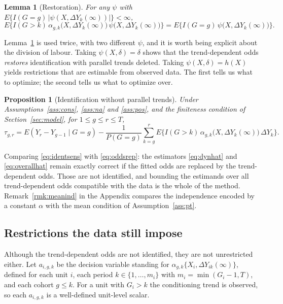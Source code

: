 \documentclass[12pt]{article}
\newtheorem{lemma}{Lemma}
\newtheorem{proposition}{Proposition}
\theoremstyle{remark}
\begin{document}
\begin{lemma}[Restoration]
\label{lem:restore}
For any $\psi$ with $E\{I(G{=}g)\,|\psi(X, \Delta Y_k(\infty))|\} < \infty$,
\begin{equation}
E\big\{ I(G{>}k)\, \alpha_{g,k}\big(X, \Delta Y_k(\infty)\big)\,
 \psi\big(X, \Delta Y_k(\infty)\big)\big\}
= E\big\{ I(G{=}g)\, \psi\big(X, \Delta Y_k(\infty)\big)\big\}.
\label{eq:restore}
\end{equation}
\end{lemma}

Lemma~\ref{lem:restore} is used twice, with two different $\psi$, and it is worth being
explicit about the division of labour. Taking $\psi(X,\delta) = \delta$ shows that the
trend-dependent odds \emph{restores} identification with parallel trends deleted. Taking
$\psi(X,\delta) = h(X)$ yields restrictions that are estimable from observed data. The
first tells us what to optimize; the second tells us what to optimize over.

\begin{proposition}[Identification without parallel trends]
\label{prop:ident}
Under Assumptions~\ref{ass:cons}, \ref{ass:na} and \ref{ass:pos}, and the finiteness
condition of Section~\ref{sec:model}, for $1 \le g \le r \le T$,
\begin{equation}
\tau_{g,r} = E(Y_r - Y_{g-1} \mid G{=}g)
 - \frac{1}{P(G{=}g)}\sum_{k=g}^{r}
   E\big\{I(G{>}k)\, \alpha_{g,k}\big(X,\Delta Y_k(\infty)\big)\, \Delta Y_k\big\}.
\label{eq:identsens}
\end{equation}
\end{proposition}

Comparing \eqref{eq:identsens} with \eqref{eq:oddsrep}: the estimators
\eqref{eq:dynhat} and \eqref{eq:overallhat} remain exactly correct if the fitted odds are
replaced by the trend-dependent odds. Those are not identified, and bounding the estimands
over all trend-dependent odds compatible with the data is the whole of the method.
Remark~\ref{rmk:meanind} in the Appendix compares the independence encoded by a constant
$\alpha$ with the mean condition of Assumption~\ref{ass:pt}.

\subsection{Restrictions the data still impose}
\label{sec:moments}

Although the trend-dependent odds are not identified, they are not unrestricted either.
Let $a_{i,g,k}$ be the decision variable standing for
$\alpha_{g,k}\{X_i, \Delta Y_{ik}(\infty)\}$, defined for each unit $i$, each period
$k \in \{1, \ldots, m_i\}$ with $m_i = \min(G_i - 1, T)$, and each cohort $g \le k$. For a
unit with $G_i > k$ the conditioning trend is observed, so each $a_{i,g,k}$ is a
well-defined unit-level scalar.
\end{document}
